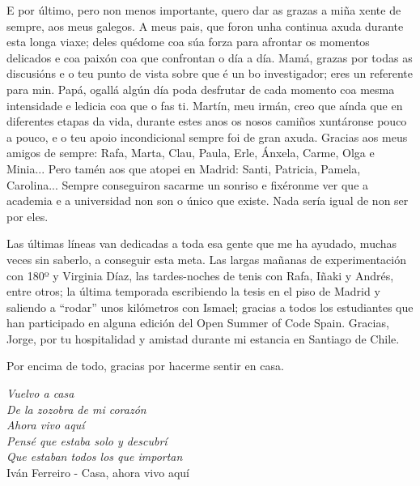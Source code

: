 \begin{acknowledgementslong}
E por último, pero non menos importante, quero dar as grazas  a miña xente de sempre, aos meus galegos. A meus pais, que foron unha continua axuda durante  esta longa viaxe; deles quédome coa súa forza para afrontar os momentos delicados e coa paixón coa que confrontan o día a día. Mamá, grazas por todas as discusións e o teu punto de vista sobre que é un bo investigador; eres un referente para min. Papá, ogallá algún día poda desfrutar de cada momento coa mesma intensidade e ledicia coa que o fas ti. Martín, meu irmán, creo que aínda que en diferentes etapas da vida, durante estes anos os nosos camiños xuntáronse pouco a pouco, e o teu apoio incondicional sempre foi de gran axuda. Gracias aos meus amigos de sempre: Rafa, Marta, Clau, Paula, Erle, Ánxela, Carme, Olga e Minia... Pero tamén aos que atopei en Madrid: Santi, Patricia, Pamela, Carolina... Sempre conseguiron sacarme un sonriso e fixéronme ver que a academia e a universidad non son o único que existe. Nada sería igual de non ser por eles.

Las últimas líneas van dedicadas a toda esa gente que me ha ayudado, muchas veces sin saberlo, a conseguir esta meta. Las largas mañanas de experimentación con 180º y Virginia Díaz, las tardes-noches de tenis con Rafa, Iñaki y Andrés, entre otros; la última temporada escribiendo la tesis en el piso de Madrid y saliendo a ``rodar'' unos kilómetros con Ismael; gracias a todos los estudiantes que han participado en alguna edición del Open Summer of Code Spain. Gracias, Jorge, por tu hospitalidad y amistad durante mi estancia en Santiago de Chile.

Por encima de todo, gracias por hacerme sentir en casa.

\vspace{10mm}

\textit{
\null\hfill Vuelvo a casa \\
\null\hfill De la zozobra de mi corazón \\
\null\hfill Ahora vivo aquí \\
\null\hfill Pensé que estaba solo y descubrí \\
\null\hfill Que estaban todos los que importan \vspace{6mm} \\
} 
\null\hfill Iván Ferreiro - Casa, ahora vivo aquí

\end{acknowledgementslong}









